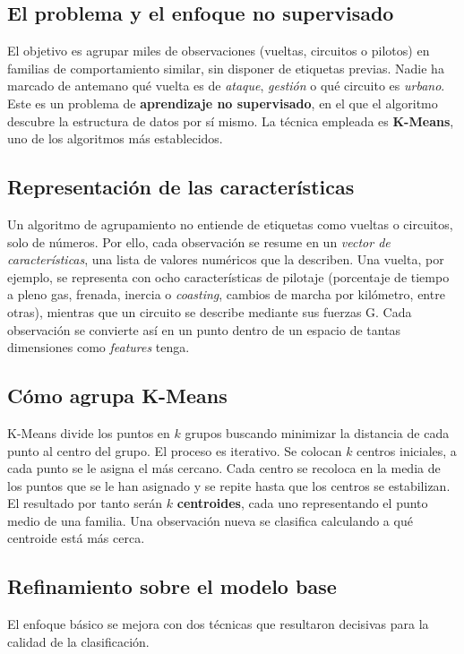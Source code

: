 \documentclass[12pt,a4paper,twoside,openright]{book}
\begin{document}
\subsection{El problema y el enfoque no supervisado}
El objetivo es agrupar miles de observaciones (vueltas, circuitos o pilotos) en familias de comportamiento similar, sin disponer de etiquetas previas. Nadie ha marcado de antemano qué vuelta es de \textit{ataque}, \textit{gestión} o qué circuito es \textit{urbano}. Este es un problema de \textbf{aprendizaje no supervisado}, en el que el algoritmo descubre la estructura de datos por sí mismo. La técnica empleada es \textbf{K-Means}, uno de los algoritmos más establecidos.

\subsection{Representación de las características}
Un algoritmo de agrupamiento no entiende de etiquetas como vueltas o circuitos, solo de números. Por ello, cada observación se resume en un \textit{vector de características}, una lista de valores numéricos que la describen.
Una vuelta, por ejemplo, se representa con ocho características de pilotaje (porcentaje de tiempo a pleno gas, frenada, inercia o \textit{coasting}, cambios de marcha por kilómetro, entre otras), mientras que un circuito se describe mediante sus fuerzas G. Cada observación se convierte así en un punto dentro de un espacio de tantas dimensiones como \textit{features} tenga.

\subsection{Cómo agrupa K-Means}
K-Means divide los puntos en $k$ grupos buscando minimizar la distancia de cada punto al centro del grupo. El proceso es iterativo. Se colocan $k$ centros iniciales, a cada punto se le asigna el más cercano. Cada centro se recoloca en la media de los puntos que se le han asignado y se repite hasta que los centros se estabilizan. El resultado por tanto serán $k$ \textbf{centroides}, cada uno representando el punto medio de una familia. Una observación nueva se clasifica calculando a qué centroide está más cerca.

\subsection{Refinamiento sobre el modelo base}
El enfoque básico se mejora con dos técnicas que resultaron decisivas para la calidad de la clasificación.
\end{document}
